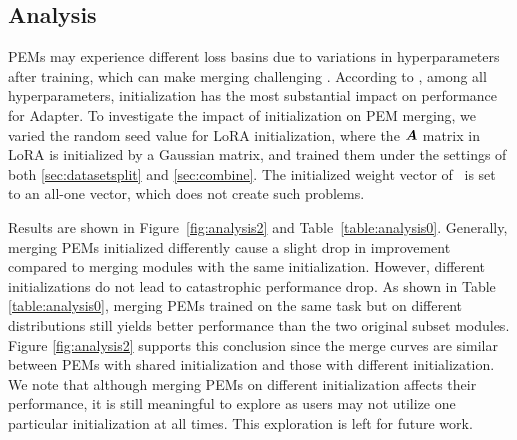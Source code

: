 \subsection{Analysis}
\label{sec:analysis}
 
PEMs may experience different loss basins due to variations in hyperparameters after training, which can make merging challenging \citep{ainsworth2022git}. According to \citet{qin2022exploring}, among all hyperparameters, initialization has the most substantial impact on performance for Adapter.
To investigate the impact of initialization on PEM merging, we varied the random seed value for LoRA initialization, where the ${\bm{A}}$ matrix in LoRA is initialized by a Gaussian matrix, and trained them under the settings of both \textsection \ref{sec:datasetsplit} and \textsection \ref{sec:combine}. 
The initialized weight vector of \ia~is set to an all-one vector, which does not create such problems.

Results are shown in Figure~\ref{fig:analysis2} and Table~\ref{table:analysis0}.
Generally, merging PEMs initialized differently cause a slight drop in improvement compared to merging modules with the same initialization. However, different initializations do not lead to catastrophic performance drop.
As shown in Table \ref{table:analysis0}, merging PEMs trained on the same task but on different distributions still yields better performance than the two original subset modules. 
Figure \ref{fig:analysis2} supports this conclusion since the merge curves are similar between PEMs with shared initialization and those with different initialization.
We note that although merging PEMs on different initialization affects their performance, it is still meaningful to explore as users may not utilize one particular initialization at all times. This exploration is left for future work.


